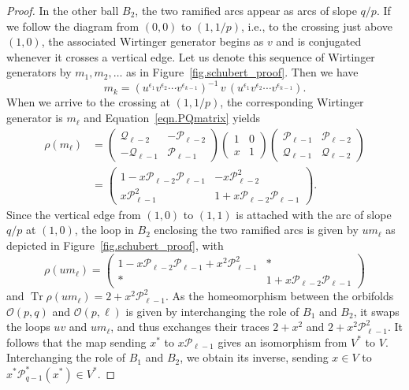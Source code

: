 \documentclass{amsart}
\newcommand{\calO}{\mathcal{O}}
\DeclareMathOperator{\Tr}{Tr}
\def\calP{\mathcal{P}}
\def\calQ{\mathcal{Q}}
\theoremstyle{definition}
\begin{document}
\begin{proof}
    In the other ball $B_2$, the two ramified arcs appear as arcs of slope $q/p$.  If we follow the diagram from $(0,0)$ to $(1,1/p)$, i.e., to the crossing just above $(1,0)$, the associated Wirtinger generator begins as  $v$ and is conjugated whenever it crosses a vertical edge. Let us denote this sequence of Wirtinger generators by $m_1,m_2,\ldots$ as in Figure~\ref{fig.schubert_proof}. Then we have
    $$ 
       m_k = (u^{\epsilon_1}v^{\epsilon_2} \cdots v^{\epsilon_{k-1}})^{-1}\, v \,(u^{\epsilon_1}v^{\epsilon_2} \cdots v^{\epsilon_{k-1}}).
    $$
    When we arrive to the crossing at $(1,1/p)$, the corresponding Wirtinger generator is $m_\ell$ 
    and Equation~\eqref{eqn.PQmatrix} yields 
    \begin{align*}
        \rho(m_\ell) & = \begin{pmatrix}
        \calQ_{\ell-2} & - \calP_{\ell-2} \\
        -\calQ_{\ell-1} & \calP_{\ell-1} 
    \end{pmatrix}
    \begin{pmatrix}
        1 & 0 \\
        x & 1
    \end{pmatrix}
    \begin{pmatrix}
        \calP_{\ell-1} & \calP_{\ell-2} \\
        \calQ_{\ell-1} & \calQ_{\ell-2} 
    \end{pmatrix}\\
    &  =
    \begin{pmatrix}
        1-x \calP_{\ell-2}\calP_{\ell-1} & -x \calP^2_{\ell-2} \\
        x \calP_{\ell-1}^2 & 1+x  \calP_{\ell-2}\calP_{\ell-1}
    \end{pmatrix}.
    \end{align*}
    Since the vertical edge from $(1,0)$ to $(1,1)$ is attached with the arc of slope $q/p$ at $(1,0)$, the loop in $B_2$ enclosing the two ramified arcs is given by $u m_{\ell}$ as depicted in Figure~\ref{fig.schubert_proof}, with
    $$\rho(um_{\ell}) = \begin{pmatrix}
        1-x \calP_{\ell-2} \calP_{\ell-1} + x^2 \calP_{\ell-1}^2 & * \\
        * & 1+x\calP_{\ell-2}\calP_{\ell-1}
    \end{pmatrix}
    $$
    and $\Tr \rho(um_{\ell}) = 2+ x^2 \calP_{\ell-1}^2$. As the homeomorphism between the orbifolds $\calO(p,q)$ and $\calO(p,\ell)$ is given by interchanging the role of $B_1$ and $B_2$, it swaps the loops $uv$ and $um_{\ell}$, and thus exchanges their traces $2+x^2$ and $2+x^2 \calP_{\ell-1}^2$. It follows that the map sending $x^\ast$ to $x \calP_{\ell-1}$ gives an isomorphism from $V^\ast$ to $V$.
    Interchanging the role of $B_1$ and $B_2$, we obtain its inverse, sending $x \in V$ to $x^\ast \calP_{q-1}^\ast(x^\ast)\in V^\ast$.
\end{proof}
\end{document}
